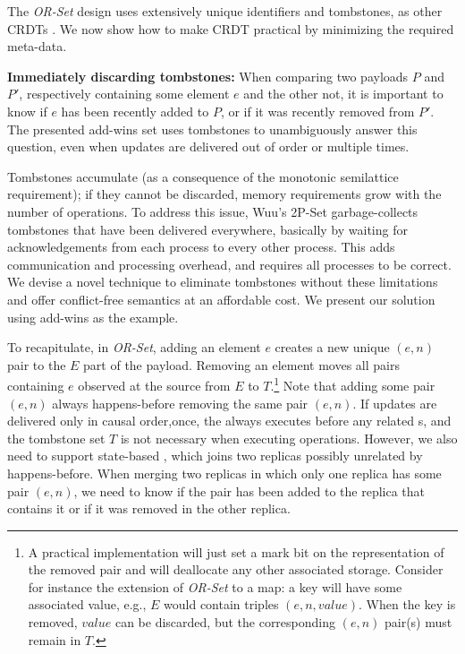\documentclass[a4paper]{article}
\begin{document}
The \emph{OR-Set} design uses extensively unique identifiers and tombstones,
as other CRDTs \cite{alg:rep:sh131,app:rep:1652,rep:syn:sh138}.  We now show
how to make CRDT practical by minimizing the required meta-data.

{\bf Immediately discarding tombstones:} When comparing two payloads $P$ and
$P'$, respectively containing some element $e$ and the other not, it is
important to know if $e$ has been recently added to $P$, or if it was
recently removed from $P'$.  The presented add-wins set uses tombstones to
unambiguously answer this question, even when updates are delivered out of
order or multiple times.

Tombstones accumulate (as a consequence of the monotonic
semilattice requirement); if they cannot be discarded, memory
requirements grow with the number of operations.
To address this issue, Wuu's 2P-Set \cite{app:rep:optim:1501}
garbage-collects tombstones that have been delivered everywhere, basically by
waiting for acknowledgements from each process to every other process.
This adds communication and processing overhead, and requires all
processes to be correct. We devise a novel technique to eliminate tombstones without these
limitations and offer conflict-free semantics at an affordable cost.
We present our solution using add-wins as the example.

To recapitulate, in \emph{OR-Set}, adding an element $e$ creates a new unique
$(e,n)$ pair to the $E$ part of the payload.  Removing an element moves all
pairs containing $e$ observed at the source from $E$ to $T$.\footnote{
A  practical implementation will just set a mark bit on the representation
of the removed pair and will deallocate any other associated storage.
Consider for instance the extension of \emph{OR-Set} to a map: a key will have some
associated value, e.g., $E$ would contain triples $(e,n,\mathit{value})$.
When the key is removed, $\mathit{value}$ can be discarded, but the
corresponding $(e,n)$ pair(s) must remain in $T$.  }
Note that adding some pair $(e,n)$ always happens-before removing the same
pair $(e,n)$.  If updates are delivered only in causal order,once, the \add always executes before any related \remove{}s, and the
tombstone set $T$ is not necessary when executing operations.  However, we
also need to support state-based \merge, which joins two replicas possibly
unrelated by happens-before.  When merging two replicas in which only one
replica has some pair $(e,n)$, we need to know if the pair has been added to
the replica that contains it or if it was removed in the other replica.
\end{document}

